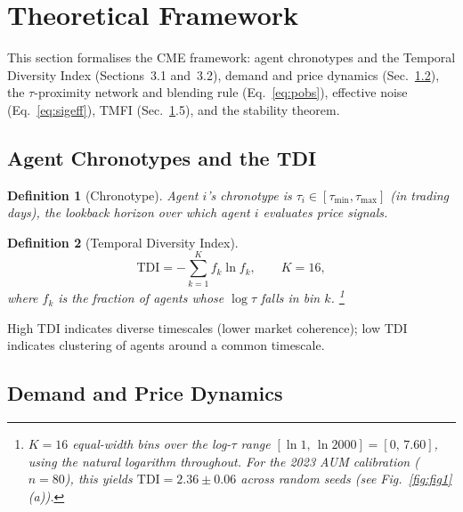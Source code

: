 \documentclass[10pt,twocolumn]{article}
\newtheorem{definition}{Definition}
\begin{document}
\section{Theoretical Framework}
\label{sec:theory}

This section formalises the CME framework: agent chronotypes and the
Temporal Diversity Index (Sections~3.1 and~3.2), demand and price
dynamics (Sec.~\ref{sec:demand}), the $\tau$-proximity network and
blending rule (Eq.~\eqref{eq:pobs}), effective noise (Eq.~\eqref{eq:sigeff}),
TMFI (Sec.~\ref{sec:theory}.5), and the stability theorem.

\subsection{Agent Chronotypes and the TDI}

\begin{definition}[Chronotype]
Agent $i$'s chronotype is $\tau_i \in [\tau_{\min}, \tau_{\max}]$
(in trading days), the lookback horizon over which agent $i$ evaluates
price signals.
\end{definition}

\begin{definition}[Temporal Diversity Index]
\label{def:tdi}
\[
  \mathrm{TDI} = -\sum_{k=1}^{K} f_k \ln f_k, \qquad K = 16,
\]
where $f_k$ is the fraction of agents whose $\log\tau$ falls in bin $k$.%
\footnote{$K=16$ equal-width bins over the log-$\tau$ range
$[\ln 1,\,\ln 2000]=[0,\,7.60]$, using the natural logarithm throughout.
For the 2023 AUM calibration ($n=80$), this yields
$\mathrm{TDI} = 2.36 \pm 0.06$ across random seeds (see Fig.~\ref{fig:fig1}(a)).}
\end{definition}

\noindent
High TDI indicates diverse timescales (lower market coherence);
low TDI indicates clustering of agents around a common timescale.

\subsection{Demand and Price Dynamics}
\label{sec:demand}
\end{document}

